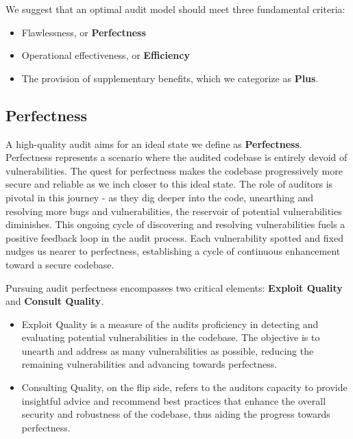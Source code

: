 \documentclass[10pt]{extarticle}
\def\tightlist{}
\begin{document}
We suggest that an optimal audit model should meet three fundamental
criteria:

\begin{itemize}
\tightlist
\item
  Flawlessness, or \textbf{Perfectness}
\item
  Operational effectiveness, or \textbf{Efficiency}
\item
  The provision of supplementary benefits, which we categorize as
  \textbf{Plus}.
\end{itemize}

\subsection{Perfectness}\label{21-perfectness}

A high-quality audit aims for an ideal state we define as
\textbf{Perfectness}. Perfectness represents a scenario where the
audited codebase is entirely devoid of vulnerabilities. The quest for
perfectness makes the codebase progressively more secure and reliable as
we inch closer to this ideal state. The role of auditors is pivotal in
this journey - as they dig deeper into the code, unearthing and
resolving more bugs and vulnerabilities, the reservoir of potential
vulnerabilities diminishes. This ongoing cycle of discovering and
resolving vulnerabilities fuels a positive feedback loop in the audit
process. Each vulnerability spotted and fixed nudges us nearer to
perfectness, establishing a cycle of continuous enhancement toward a
secure codebase.

Pursuing audit perfectness encompasses two critical elements:
\textbf{Exploit Quality} and \textbf{Consult Quality}.

\begin{itemize}
\item
  Exploit Quality is a measure of the audit\textquotesingle s
  proficiency in detecting and evaluating potential vulnerabilities in
  the codebase. The objective is to unearth and address as many
  vulnerabilities as possible, reducing the remaining vulnerabilities
  and advancing towards perfectness.
\item
  Consulting Quality, on the flip side, refers to the
  auditor\textquotesingle s capacity to provide insightful advice and
  recommend best practices that enhance the overall security and
  robustness of the codebase, thus aiding the progress towards
  perfectness.
\end{itemize}
\end{document}

